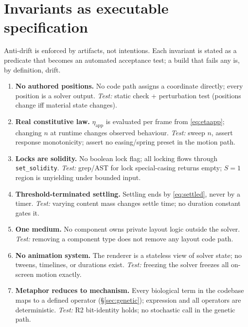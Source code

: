 \documentclass[11pt]{article}
\begin{document}
\section{Invariants as executable specification}\label{sec:invariants}

Anti-drift is enforced by artifacts, not intentions. Each invariant is stated as a predicate that
becomes an automated acceptance test; a build that fails any is, by definition, drift.

\begin{enumerate}[leftmargin=1.8em,label=\textbf{I\arabic*.}]
  \item \textbf{No authored positions.} No code path assigns a coordinate directly; every position
  is a solver output. \emph{Test:} static check + perturbation test (positions change iff material
  state changes).
  \item \textbf{Real constitutive law.} $\eta_{\text{app}}$ is evaluated per frame from
  \eqref{eq:etaapp}; changing $n$ at runtime changes observed behaviour. \emph{Test:} sweep $n$,
  assert response monotonicity; assert no easing/spring preset in the motion path.
  \item \textbf{Locks are solidity.} No boolean lock flag; all locking flows through
  \texttt{set\_solidity}. \emph{Test:} grep/AST for lock special-casing returns empty; $S=1$ region
  is unyielding under bounded input.
  \item \textbf{Threshold-terminated settling.} Settling ends by \eqref{eq:settled}, never by a
  timer. \emph{Test:} varying content mass changes settle time; no duration constant gates it.
  \item \textbf{One medium.} No component owns private layout logic outside the solver. \emph{Test:}
  removing a component type does not remove any layout code path.
  \item \textbf{No animation system.} The renderer is a stateless view of solver state; no tweens,
  timelines, or durations exist. \emph{Test:} freezing the solver freezes all on-screen motion
  exactly.
  \item \textbf{Metaphor reduces to mechanism.} Every biological term in the codebase maps to a
  defined operator (\S\ref{sec:genetic}); expression and all operators are deterministic.
  \emph{Test:} R2 bit-identity holds; no stochastic call in the genetic path.
\end{enumerate}
\end{document}
